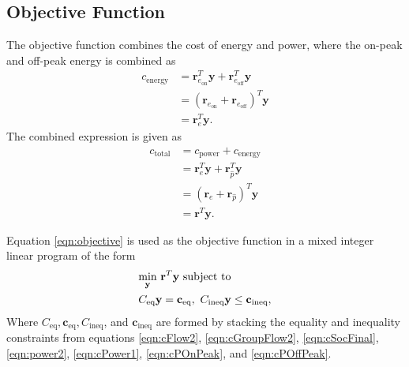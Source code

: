 \subsection{Objective Function}
The objective function combines the cost of energy and power, where the on-peak and off-peak energy is combined as 
\begin{equation}\label{eqn:cEnergy2}
	\begin{aligned}
		c_{\text{energy}} &= \mathbf{r}_{e_\text{on}}^T\mathbf{y} + \mathbf{r}_{e_\text{off}}^T\mathbf{y} \\
		&=\left ( \mathbf{r}_{e_\text{on}} + \mathbf{r}_{e_\text{off}} \right )^T \mathbf{y} \\
		&= \mathbf{r}_e^T\mathbf{y}.
	\end{aligned}
\end{equation}
The combined expression is given as 
\begin{equation}\label{eqn:objective}
	\begin{aligned}
		c_{\text{total}} &= c_{\text{power}} + c_{\text{energy}} \\ 
				 &= \mathbf{r}_e^T\mathbf{y} + \mathbf{r}_{\hat{p}}^T\mathbf{y} \\
				 &= \left ( \mathbf{r}_e + \mathbf{r}_{\hat{p}} \right )^T\mathbf{y} \\
				 &= \mathbf{r}^T\mathbf{y}.
	\end{aligned}
\end{equation}
\par Equation \ref{eqn:objective} is used as the objective function in a mixed integer linear program of the form
\begin{equation}
	\begin{aligned}
		& \underset{\mathbf{y}}{\scalebox{1}{\text{min}}} \ \mathbf{r}^T\mathbf{y} \ \text{subject to}\\
		& C_{\text{eq}}\mathbf{y} = \mathbf{c}_{\text{eq}}, \ C_{\text{ineq}}\mathbf{y} \le \mathbf{c}_{\text{ineq}},
	\end{aligned}
\end{equation}
Where $C_{\text{eq}}, \mathbf{c}_{\text{eq}}, C_{\text{ineq}}$, and $\mathbf{c}_{\text{ineq}}$ are formed by stacking the equality and inequality constraints from equations \ref{eqn:cFlow2}, \ref{eqn:cGroupFlow2}, \ref{eqn:cSocFinal}, \ref{eqn:power2}, \ref{eqn:cPower1}, \ref{eqn:cPOnPeak}, and \ref{eqn:cPOffPeak}.
